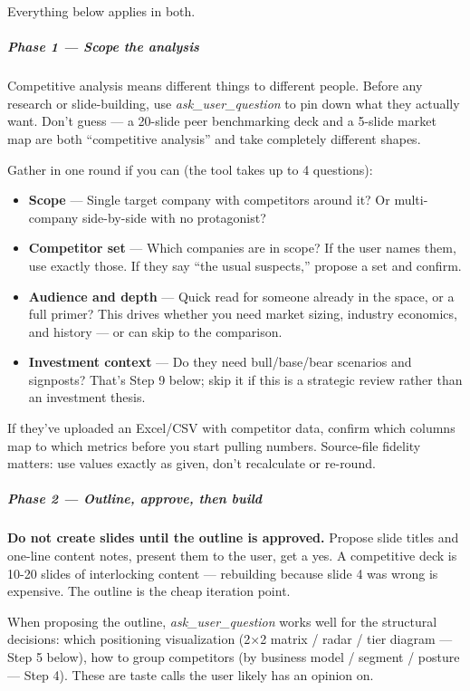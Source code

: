 \documentclass[11pt]{article}
\begin{document}
Everything below applies in both.


\subparagraph{Phase 1 — Scope the analysis}\mbox{}\par

Competitive analysis means different things to different people. Before any research or slide-building, use \emph{ask\_\allowbreak{}user\_\allowbreak{}question} to pin down what they actually want. Don't guess — a 20-slide peer benchmarking deck and a 5-slide market map are both ``competitive analysis'' and take completely different shapes.


Gather in one round if you can (the tool takes up to 4 questions):


\begin{itemize}[leftmargin=*,itemsep=2pt,topsep=2pt]
\item {} \textbf{Scope} — Single target company with competitors around it? Or multi-company side-by-side with no protagonist?
\item {} \textbf{Competitor set} — Which companies are in scope? If the user names them, use exactly those. If they say ``the usual suspects,'' propose a set and confirm.
\item {} \textbf{Audience and depth} — Quick read for someone already in the space, or a full primer? This drives whether you need market sizing, industry economics, and history — or can skip to the comparison.
\item {} \textbf{Investment context} — Do they need bull/base/bear scenarios and signposts? That's Step 9 below; skip it if this is a strategic review rather than an investment thesis.
\end{itemize}

If they've uploaded an Excel/CSV with competitor data, confirm which columns map to which metrics before you start pulling numbers. Source-file fidelity matters: use values exactly as given, don't recalculate or re-round.


\subparagraph{Phase 2 — Outline, approve, then build}\mbox{}\par

\textbf{Do not create slides until the outline is approved.} Propose slide titles and one-line content notes, present them to the user, get a yes. A competitive deck is 10-20 slides of interlocking content — rebuilding because slide 4 was wrong is expensive. The outline is the cheap iteration point.


When proposing the outline, \emph{ask\_\allowbreak{}user\_\allowbreak{}question} works well for the structural decisions: which positioning visualization (2×2 matrix / radar / tier diagram — Step 5 below), how to group competitors (by business model / segment / posture — Step 4). These are taste calls the user likely has an opinion on.
\end{document}
